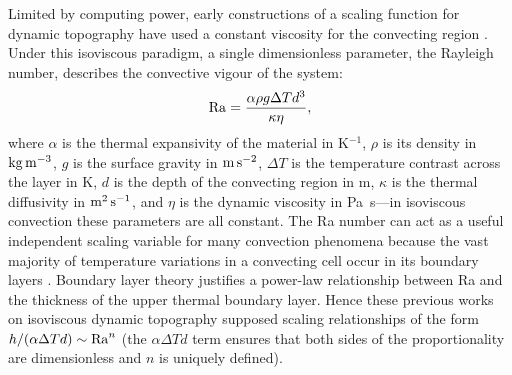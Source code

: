 \documentclass[trackchanges]{aastex63}
\newcommand{\jr}[1]{\textit{\textcolor{blue}{{#1}}}}
\begin{document}
Limited by computing power, early constructions of a scaling function for dynamic topography have used a constant viscosity for the convecting region \citep{parsons_relationship_1983, kiefer_geoid_1992}. Under this isoviscous paradigm, a single dimensionless parameter, the Rayleigh number, describes the convective vigour of the system:
\begin{equation}\label{eq:Ra}
    {\rm Ra} = \frac{\alpha\rho g \Delta T d^3}{\kappa \eta},
\end{equation}
where $\alpha$ is the thermal expansivity of the material in K$^{-1}$, $\rho$ is its density in ${\rm kg\,m^{-3}}$, $g$ is the surface gravity in ${\rm m\,s^{-2}}$, $\Delta T$ is the temperature contrast across the layer in K, $d$ is the depth of the convecting region in m, $\kappa$ is the thermal diffusivity in ${\rm m^2\,s^{-1}}$, and $\eta$ is the dynamic viscosity in Pa~s---in isoviscous convection these parameters are all constant. The Ra number can act as a useful independent scaling variable for many convection phenomena because the vast majority of temperature variations in a convecting cell occur in its boundary layers \citep{mckenzie_convection_1974}. Boundary layer theory justifies a power-law relationship between Ra and the thickness of the upper thermal boundary layer. Hence these previous works on isoviscous dynamic topography supposed scaling relationships of the form $h/(\alpha \Delta T d) \sim {\rm Ra}^n$ (the $\alpha \Delta T d$ term ensures that both sides of the proportionality are dimensionless and $n$ is uniquely defined). %
\end{document}

